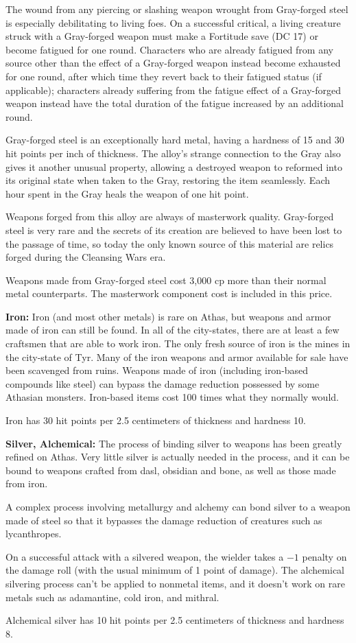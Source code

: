 The wound from any piercing or slashing weapon wrought from Gray-forged steel is especially debilitating to living foes. On a successful critical, a living creature struck with a Gray-forged weapon must make a Fortitude save (DC 17) or become fatigued for one round. Characters who are already fatigued from any source other than the effect of a Gray-forged weapon instead become exhausted for one round, after which time they revert back to their fatigued status (if applicable); characters already suffering from the fatigue effect of a Gray-forged weapon instead have the total duration of the fatigue increased by an additional round.

Gray-forged steel is an exceptionally hard metal, having a hardness of 15 and 30 hit points per inch of thickness. The alloy's strange connection to the Gray also gives it another unusual property, allowing a destroyed weapon to reformed into its original state when taken to the Gray, restoring the item seamlessly. Each hour spent in the Gray heals the weapon of one hit point.

Weapons forged from this alloy are always of masterwork quality. Gray-forged steel is very rare and the secrets of its creation are believed to have been lost to the passage of time, so today the only known source of this material are relics forged during the Cleansing Wars era.

Weapons made from Gray-forged steel cost 3,000 cp more than their normal metal counterparts. The masterwork component cost is included in this price.

\textbf{Iron:} Iron (and most other metals) is rare on Athas, but weapons and armor made of iron can still be found. In all of the city-states, there are at least a few craftsmen that are able to work iron. The only fresh source of iron is the mines in the city-state of Tyr. Many of the iron weapons and armor available for sale have been scavenged from ruins. Weapons made of iron (including iron-based compounds like steel) can bypass the damage reduction possessed by some Athasian monsters. Iron-based items cost 100 times what they normally would.

Iron has 30 hit points per 2.5 centimeters of thickness and hardness 10.

\textbf{Silver, Alchemical:} The process of binding silver to weapons has been greatly refined on Athas. Very little silver is actually needed in the process, and it can be bound to weapons crafted from dasl, obsidian and bone, as well as those made from iron.

A complex process involving metallurgy and alchemy can bond silver to a weapon made of steel so that it bypasses the damage reduction of creatures such as lycanthropes.

On a successful attack with a silvered weapon, the wielder takes a $-1$ penalty on the damage roll (with the usual minimum of 1 point of damage). The alchemical silvering process can't be applied to nonmetal items, and it doesn't work on rare metals such as adamantine, cold iron, and mithral.

Alchemical silver has 10 hit points per 2.5 centimeters of thickness and hardness 8.
